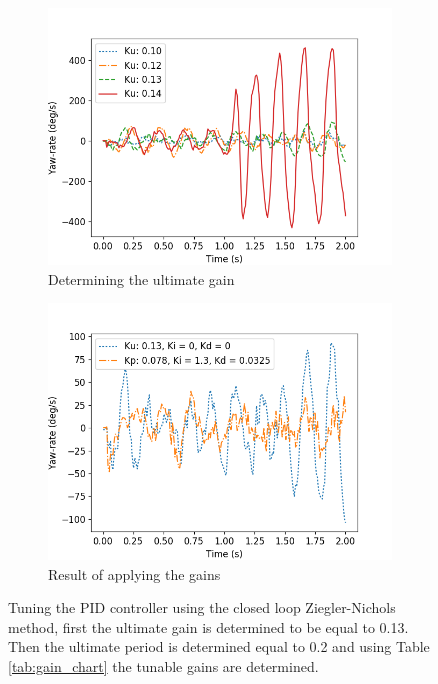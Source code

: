 \begin{figure}
	\begin{subfigure}[b]{0.5\textwidth}
		\includegraphics[width=\textwidth]{pics/straight_ku.png}
		\caption{Determining the ultimate gain}
		\label{fig:ultimate_gain}
	\end{subfigure}
	\begin{subfigure}[b]{0.5\textwidth}
		\includegraphics[width=\textwidth]{pics/straight_ku_with_tu.png}
		\caption{Result of applying the gains}
		\label{fig:gain_tuning}
	\end{subfigure}
	\caption{Tuning the PID controller using the closed loop Ziegler-Nichols method, first the ultimate gain is determined to be equal to 0.13. Then the ultimate period is determined equal to 0.2 and using Table \ref{tab:gain_chart} the tunable gains are determined.}
\end{figure}

